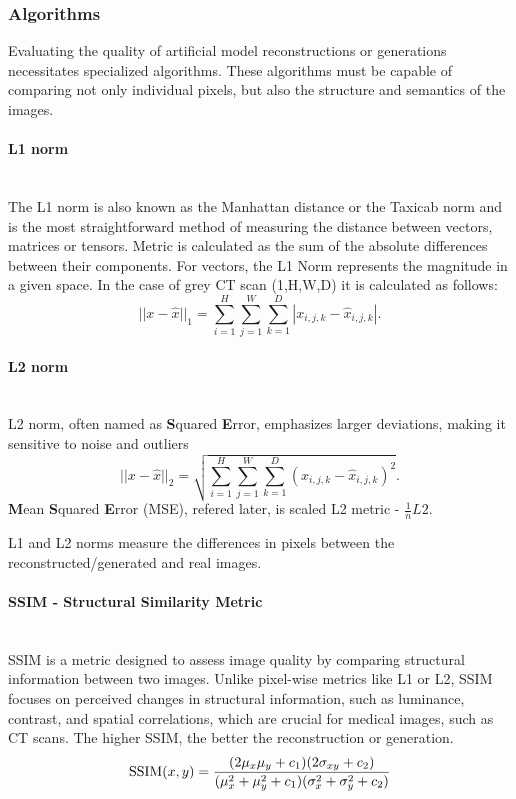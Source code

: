 \subsubsection{Algorithms}
Evaluating the quality of artificial model reconstructions or generations necessitates specialized algorithms. These algorithms must be capable of comparing not only individual pixels, but also the structure and semantics of the images.
\paragraph{L1 norm}\mbox{}\\
\indent The L1 norm is also known as the Manhattan distance or the Taxicab norm and is the most straightforward method of measuring the distance between vectors, matrices or tensors. Metric is calculated as the sum of the absolute differences between their components. 
For vectors, the L1 Norm represents the magnitude in a given space. 
In the case of grey CT scan (1,H,W,D) it is calculated as follows:
\begin{equation}
||x-\hat{x}||_1 = \sum_{i=1}^{H} \sum_{j=1}^{W} \sum_{k=1}^{D} |x_{i,j,k}-\hat{x}_{i,j,k}|.
\label{norm-l1}
\end{equation}

\paragraph{L2 norm}\mbox{}\\
\indent L2 norm, often named as \textbf{S}quared \textbf{E}rror, emphasizes larger deviations, making it sensitive to noise and outliers
\begin{equation}
||x-\hat{x}||_2 = \sqrt{\sum_{i=1}^{H} \sum_{j=1}^{W} \sum_{k=1}^{D} {(x_{i,j,k}-\hat{x}_{i,j,k})^2}}.
\label{norm-l2}
\end{equation}
\textbf{M}ean \textbf{S}quared \textbf{E}rror (MSE), refered later, is scaled L2 metric -  $\frac{1}{n}L2$.

L1 and L2 norms measure the differences in pixels between the reconstructed/generated and real images.
\paragraph{SSIM - Structural Similarity Metric}\mbox{}\\
\indent SSIM is a metric designed to assess image quality by comparing structural information between two images. Unlike pixel-wise metrics like L1 or L2, SSIM focuses on perceived changes in structural information, such as luminance, contrast, and spatial correlations, which are crucial for medical images, such as CT scans. The higher SSIM, the better the reconstruction or generation.
\begin{equation}
    \hbox{SSIM}(x,y) = \frac{(2\mu_x\mu_y + c_1)(2\sigma_{xy} + c_2)}{(\mu_x^2 + \mu_y^2 + c_1)(\sigma_x^2 + \sigma_y^2 + c_2)}
\end{equation}

